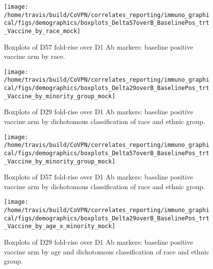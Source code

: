 \documentclass[]{book}
\theoremstyle{definition}
\theoremstyle{definition}
\theoremstyle{definition}
\newcommand{\1}{\mathbbm{1}}
\begin{document}
\clearpage
\begin{figure}[H]

{\centering \texttt{[image: /home/travis/build/CoVPN/correlates\_reporting/immuno\_graphical/figs/demographics/boxplots\_Delta57overB\_BaselinePos\_trt\_Vaccine\_by\_race\_mock]} 

}

\caption{Boxplots of D57 fold-rise over D1 Ab markers: baseline positive vaccine arm by race.}\label{fig:unnamed-chunk-191}
\end{figure}

\clearpage

\clearpage

\clearpage
\begin{figure}[H]

{\centering \texttt{[image: /home/travis/build/CoVPN/correlates\_reporting/immuno\_graphical/figs/demographics/boxplots\_Delta29overB\_BaselinePos\_trt\_Vaccine\_by\_minority\_group\_mock]} 

}

\caption{Boxplots of D29 fold-rise over D1 Ab markers: baseline positive vaccine arm by dichotomous classification of race and ethnic group.}\label{fig:unnamed-chunk-194}
\end{figure}

\clearpage
\begin{figure}[H]

{\centering \texttt{[image: /home/travis/build/CoVPN/correlates\_reporting/immuno\_graphical/figs/demographics/boxplots\_Delta57overB\_BaselinePos\_trt\_Vaccine\_by\_minority\_group\_mock]} 

}

\caption{Boxplots of D57 fold-rise over D1 Ab markers: baseline positive vaccine arm by dichotomous classification of race and ethnic group.}\label{fig:unnamed-chunk-195}
\end{figure}

\clearpage

\clearpage

\clearpage
\begin{figure}[H]

{\centering \texttt{[image: /home/travis/build/CoVPN/correlates\_reporting/immuno\_graphical/figs/demographics/boxplots\_Delta29overB\_BaselinePos\_trt\_Vaccine\_by\_age\_x\_minority\_mock]} 

}

\caption{Boxplots of D29 fold-rise over D1 Ab markers: baseline positive vaccine arm by age and dichotomous classification of race and ethnic group.}\label{fig:unnamed-chunk-198}
\end{figure}
\end{document}
